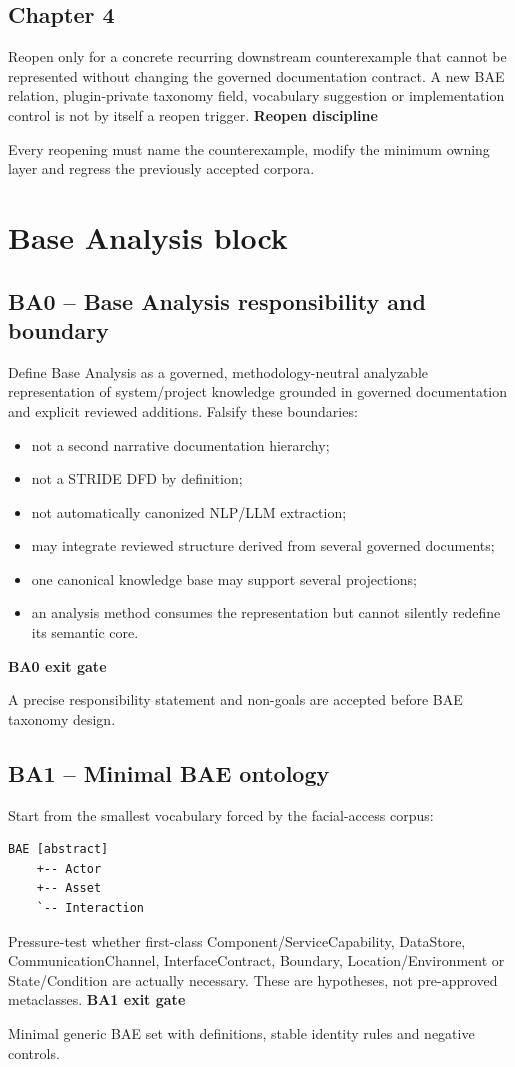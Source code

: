 \documentclass[11pt,a4paper]{article}
\newenvironment{gate}[1]{\def\FrameCommand{\fcolorbox{ddtagreen}{ddtagray}}\MakeFramed{\advance\hsize-2\width\FrameRestore}\noindent\textbf{#1}\par\smallskip}{\endMakeFramed}
\newenvironment{boundary}[1]{\def\FrameCommand{\fcolorbox{ddtaorange}{ddtagray}}\MakeFramed{\advance\hsize-2\width\FrameRestore}\noindent\textbf{#1}\par\smallskip}{\endMakeFramed}
\begin{document}
\subsection{Chapter 4}
Reopen only for a concrete recurring downstream counterexample that cannot be represented without changing the governed documentation contract. A new BAE relation, plugin-private taxonomy field, vocabulary suggestion or implementation control is not by itself a reopen trigger.
\begin{boundary}{Reopen discipline}
Every reopening must name the counterexample, modify the minimum owning layer and regress the previously accepted corpora.
\end{boundary}

\section{Base Analysis block}
\subsection{BA0 -- Base Analysis responsibility and boundary}
Define Base Analysis as a governed, methodology-neutral analyzable representation of system/project knowledge grounded in governed documentation and explicit reviewed additions. Falsify these boundaries:
\begin{itemize}
\item not a second narrative documentation hierarchy;
\item not a STRIDE DFD by definition;
\item not automatically canonized NLP/LLM extraction;
\item may integrate reviewed structure derived from several governed documents;
\item one canonical knowledge base may support several projections;
\item an analysis method consumes the representation but cannot silently redefine its semantic core.
\end{itemize}
\begin{gate}{BA0 exit gate}A precise responsibility statement and non-goals are accepted before BAE taxonomy design.\end{gate}

\subsection{BA1 -- Minimal BAE ontology}
Start from the smallest vocabulary forced by the facial-access corpus:
\begin{lstlisting}
BAE [abstract]
    +-- Actor
    +-- Asset
    `-- Interaction
\end{lstlisting}
Pressure-test whether first-class Component/ServiceCapability, DataStore, CommunicationChannel, InterfaceContract, Boundary, Location/Environment or State/Condition are actually necessary. These are hypotheses, not pre-approved metaclasses.
\begin{gate}{BA1 exit gate}Minimal generic BAE set with definitions, stable identity rules and negative controls.\end{gate}
\end{document}
